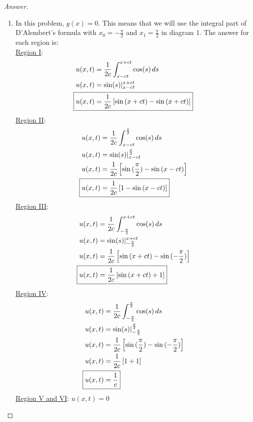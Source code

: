 \documentclass{article}
\theoremstyle{definition}
\renewcommand\qedsymbol{$\blacksquare$}
\newenvironment{ans}{\begin{proof}[Answer]\renewcommand{\qedsymbol}{}}{\end{proof}}
\begin{document}
\begin{ans}
\begin{enumerate}[(1), start = 7, resume*=answers]
    \item In this problem, $g(x)=0$. This means that we will use the integral part of D'Alembert's formula with $x_0 = -\frac{\pi}{2}$ and $x_1 = \frac{\pi}{2}$ in diagram 1. The answer for each region is:\\
    \underline{Region I}: \begin{align*}
        u(x,t)&=\frac{1}{2c} \int_{x-ct}^{x+ct} \cos(s)\,ds\\
        u(x,t)&=\sin(s)|_{x-ct}^{x+ct}\\
        \Aboxed{u(x,t)&=\frac{1}{2c} \left[ \sin{(x+ct) - \sin{(x+ct)}} \right]}
    \end{align*}
    \underline{Region II}: \begin{align*}
        u(x,t)&=\frac{1}{2c} \int_{x-ct}^{\frac{\pi}{2}} \cos(s)\,ds\\
        u(x,t)&=\sin(s)|_{x-ct}^{\frac{\pi}{2}}\\
        u(x,t)&=\frac{1}{2c} \left[ \sin{(\frac{\pi}{2}) - \sin{(x-ct)}} \right]\\
        \Aboxed{u(x,t)&=\frac{1}{2c} \left[ 1 - \sin{(x-ct)} \right]}
    \end{align*}
    \underline{Region III}: \begin{align*}
        u(x,t)&=\frac{1}{2c} \int_{-\frac{\pi}{2}}^{x+ct} \cos(s)\,ds\\
        u(x,t)&=\sin(s)|_{-\frac{\pi}{2}}^{x+ct}\\
        u(x,t)&=\frac{1}{2c} \left[ \sin{(x+ct)} - \sin{(-\frac{\pi}{2})} \right]\\
        \Aboxed{u(x,t)&=\frac{1}{2c} \left[ \sin{(x+ct)} + 1\right]}
    \end{align*}
    \underline{Region IV}: \begin{align*}
        u(x,t)&=\frac{1}{2c} \int_{-\frac{\pi}{2}}^{\frac{\pi}{2}} \cos(s)\,ds\\
        u(x,t)&=\sin(s)|_{-\frac{\pi}{2}}^{\frac{\pi}{2}}\\
        u(x,t)&=\frac{1}{2c} \left[ \sin{(\frac{\pi}{2})} - \sin{(-\frac{\pi}{2})} \right]\\
        u(x,t)&=\frac{1}{2c} \left[ 1 + 1\right]\\
        \Aboxed{u(x,t)&=\frac{1}{c}}
        \end{align*}
    \underline{Region V and VI}: $\boxed{u(x,t)=0}$


\end{enumerate}
\end{ans}
\end{document}
